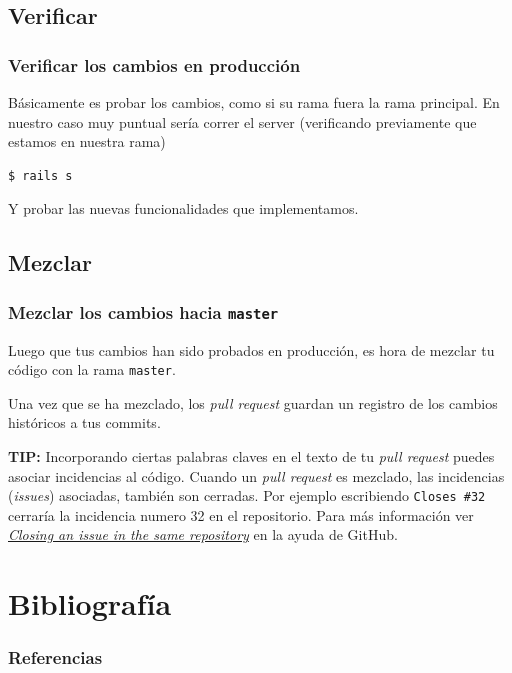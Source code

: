 \documentclass[10pt]{beamer}
\begin{document}
\subsection{Verificar}
\begin{frame}[fragile]
	\frametitle{Verificar los cambios en producción}

	Básicamente es probar los cambios, como si su rama fuera la rama principal.  
	En nuestro caso muy puntual sería correr el server (verificando previamente 
	que estamos en nuestra rama)

\begin{lstlisting}
$ rails s
\end{lstlisting}

	Y probar las nuevas funcionalidades que implementamos.
\end{frame}

\subsection{Mezclar}
\begin{frame}[fragile]
	\frametitle{Mezclar los cambios hacia \texttt{master}}
	Luego que tus cambios han sido probados en producción, es hora de mezclar 
	tu código con la rama \texttt{master}.

	Una vez que se ha mezclado, los \textit{pull request} guardan un registro 
	de los cambios históricos a tus commits.

	\textbf{TIP:} Incorporando ciertas palabras claves en el texto de tu 
	\textit{pull request} puedes asociar incidencias al código. Cuando un 
	\textit{pull request} es mezclado, las incidencias (\textit{issues}) 
	asociadas, también son cerradas. Por ejemplo escribiendo \texttt{Closes 
		\#32} cerraría la incidencia numero 32 en el repositorio.  Para más 
	información ver 
	\href{https://help.github.com/articles/closing-issues-via-commit-messages/}{\em 
		Closing an issue in the same repository} en la ayuda de GitHub.
\end{frame}


\section{Bibliografía}
\begin{frame}
	\frametitle{Referencias}

	\printbibliography[heading=none]
	\nocite{*}
\end{frame}
\end{document}

